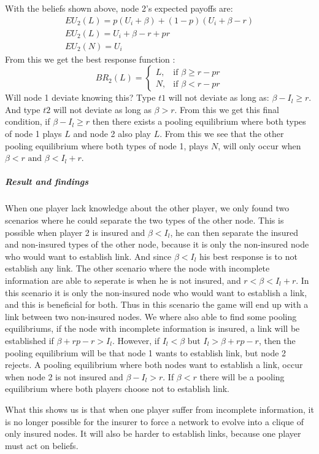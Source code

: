 With the beliefs shown above, node 2's expected payoffs are: \begin{eqnarray}
EU_{2}(L)=p(U_{i}+\beta)+(1-p)(U_{i}+\beta-r) \nonumber \\
EU_{2}(L)=U_{i}+\beta-r+pr \\
EU_{2}(N)=U_{i}
\end{eqnarray}
From this we get the best response function :
\begin{equation}
BR_{2}(L)=
\begin{cases}
	L,& \text{if } \beta\geq r-pr\\
   N,& \text{if } \beta<r-pr  
\end{cases}
\end{equation}
Will node 1 deviate knowing this?
Type $t1$ will not deviate as long as: $\beta - I_{l} \geq r$. And type $t2$ will not deviate as long as $\beta >r$.
From this we get this final condition, if $\beta-I_{l}\geq r$ then there exists a pooling equilibrium where both types of node 1 plays $L$ and node 2 also play $L$.
From this we see that the other pooling equilibrium where both types of node 1, plays $N$, will only occur when $\beta<r \text{ and } \beta<I_l+r$.

\subparagraph{Result and findings}
When one player lack knowledge about the other player, we only found two scenarios where he could separate the two types of the other node. This is possible when player 2 is insured and $\beta<I_{l}$, he can then separate the insured and non-insured types of the other node, because it is only the non-insured node who would want to establish link. And since $\beta<I_{l}$ his best response is to not establish any link.
The other scenario where the node with incomplete information are able to seperate is when he is not insured, and $r<\beta<I_{l}+r$. In this scenario it is only the non-insured node who would want to establish a link, and this is beneficial for both. Thus in this scenario the game will end up with a link between two non-insured nodes.
We where also able to find some pooling equilibriums, if the node with incomplete information is insured, a link will be established if $\beta+rp-r>I_{l}$. However, if $I_{l}<\beta \text{ but } I_{l}>\beta+rp-r$, then the pooling equilibrium will be that node 1 wants to establish link, but node 2 rejects.
A pooling equilibrium where both nodes want to establish a link, occur when node 2 is not insured and $\beta-I_{l}>r$. If $\beta<r$ there will be a pooling equilibrium where both players choose not to establish link. 

What this shows us is that when one player suffer from incomplete information, it is no longer possible for the insurer to force a network to evolve into a clique of only insured nodes. It will also be harder to establish links, because one player must act on beliefs. 

